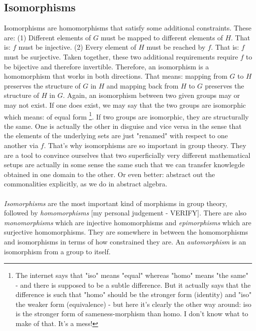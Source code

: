 \subsection{Isomorphisms}
Isomorphisms are homomorphisms that satisfy some additional constraints. These are: (1) Different elements of $G$ must be mapped to different elements of $H$. That is: $f$ must be injective. (2) Every element of $H$ must be reached by $f$. That is: $f$ must be surjective. Taken together, these two additional requirements require $f$ to be bijective and therefore invertible. Therefore, an isomorphism is a homomorphism that works in both directions. That means: mapping from $G$ to $H$ preserves the structure of $G$ in $H$ and mapping back from $H$ to $G$ preserves the structure of $H$ in $G$. Again, an isomorphism between two given groups may or may not exist. If one does exist, we may say that the two groups are isomorphic which means: of equal form \footnote{The internet says that "iso" means "equal" whereas "homo" means "the same" - and there is supposed to be a subtle difference. But it actually says that the difference is such that "homo" should be the stronger form (identity) and "iso" the weaker form (equivalence) - but here it's clearly the other way around: iso is the stronger form of sameness-morphism than homo. I don't know what to make of that. It's a mess!}. If two groups are isomorphic, they are structurally the same. One is actually the other in disguise and vice versa in the sense that the elements of the underlying sets are just "renamed" with respect to one another via $f$. 
That's why isomorphisms are so important in group theory. They are a tool to convince ourselves that two superficially very different mathematical setups are actually in some sense the same such that we can transfer knowlegde obtained in one domain to the other. Or even better: abstract out the commonalities explicitly, as we do in abstract algebra.

\paragraph{}
\emph{Isomorphisms} are the most important kind of morphisms in group theory, followed by \emph{homomorphisms} [my personal judgement - VERIFY]. There are also \emph{monomorphisms} which are injective homomorphisms and \emph{epimorphisms} which are surjective homomorphisms. They are somewhere in between the homomorphisms and isomorphisms in terms of how constrained they are. An \emph{automorphism} is an isomorphism from a group to itself.

